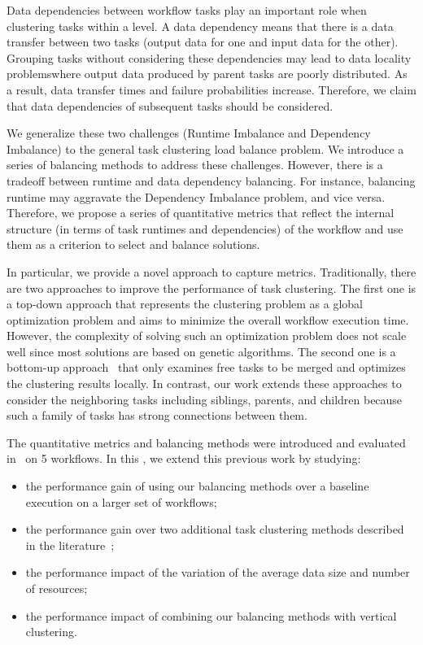 Data dependencies between workflow tasks play an important role when clustering tasks within a level. A data dependency means that there is a data transfer between two tasks (output data for one and input data for the other). Grouping tasks without considering these dependencies may lead to data locality problems\rev{, }where output data produced by parent tasks are poorly distributed. As a result, data transfer times and failure probabilities increase.
Therefore, we claim that data dependencies of subsequent tasks should be considered.

We generalize these two challenges (Runtime Imbalance and Dependency Imbalance) to the general task clustering load balance problem. We introduce a series of balancing methods to address these challenges. However, there is a tradeoff between runtime and data dependency balancing. For instance, balancing runtime may aggravate the Dependency Imbalance problem, and vice versa. Therefore, we propose a series of quantitative metrics that reflect the internal structure (in terms of task runtimes and dependencies) of the workflow and use them as a criterion to select and balance  solutions.

In particular, we provide a novel approach to capture  metrics. Traditionally, there are two approaches to improve the performance of task clustering. The first one is a top-down approach \cite{6217508} that represents the clustering problem as a global optimization problem and aims to minimize the overall workflow execution time. However, the complexity of solving such an optimization problem does not scale well since most solutions are based on genetic algorithms. The second one is a bottom-up approach~\cite{Muthuvelu:2005:DJG:1082290.1082297,Liu2009} that only examines free tasks to be merged and optimizes the clustering results locally. In contrast, our work extends these approaches to consider the neighboring tasks including siblings, parents, and children\rev{, } because such a family of tasks has strong connections between them. 

The quantitative metrics and balancing methods were introduced and evaluated in~\cite{6683907} on 5 workflows. In this , we extend this previous work by studying:

\begin{itemize}[noitemsep,nolistsep]
	\item the performance gain of using our balancing methods over a baseline execution on a larger set of workflows;
	\item the performance gain over two additional task clustering methods described in the literature~\cite{ang-2009,Liu2009};
	\item the performance impact of the variation of the average data size and number of resources;
	\item the performance impact of combining our balancing methods with vertical clustering.
\end{itemize}

